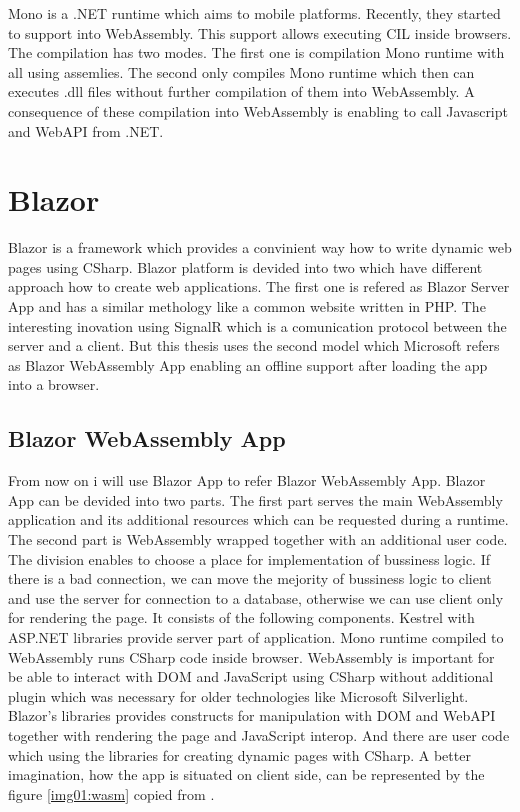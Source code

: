 Mono is a .NET runtime which aims to mobile platforms. 
Recently, they started to support \cite{compilation} into WebAssembly.
This support allows executing CIL inside browsers.
The compilation has two modes.
The first one is compilation Mono runtime with all using assemlies.
The second only compiles Mono runtime which then can executes .dll files without further compilation of them into WebAssembly.
A consequence of these compilation into WebAssembly is enabling to call Javascript and WebAPI from .NET.

\section{Blazor}

Blazor is a framework which provides a convinient way how to write dynamic web pages using CSharp.
Blazor platform is devided into two \cite{Hosting_models} which have different approach how to create web applications. 
The first one is refered as Blazor Server App and has a similar methology like a common website written in PHP.
The interesting inovation using SignalR which is a comunication protocol between the server and a client.
But this thesis uses the second model which Microsoft refers as Blazor WebAssembly App enabling an offline support after loading the app into a browser.

\subsection{Blazor WebAssembly App}
From now on i will use Blazor App to refer Blazor WebAssembly App.
Blazor App can be devided into two parts.
The first part serves the main WebAssembly application and its additional resources which can be requested during a runtime.
The second part is WebAssembly wrapped together with an additional user code.
The division enables to choose a place for implementation of bussiness logic.
If there is a bad connection, we can move the mejority of bussiness logic to client and use the server for connection to a database, otherwise we can use client only for rendering the page. It consists of the following components. 
Kestrel with ASP.NET libraries provide server part of application.
Mono runtime compiled to WebAssembly runs CSharp code inside browser.
WebAssembly is important for be able to interact with DOM and JavaScript using CSharp without additional plugin which was necessary for older technologies like Microsoft Silverlight.
Blazor's libraries provides constructs for manipulation with DOM and WebAPI together with rendering the page and JavaScript interop.
And there are user code which using the libraries for creating dynamic pages with CSharp.
A better imagination, how the app is situated on client side, can be represented by  the figure \ref{img01:wasm} copied from \cite{Glick2018}.

